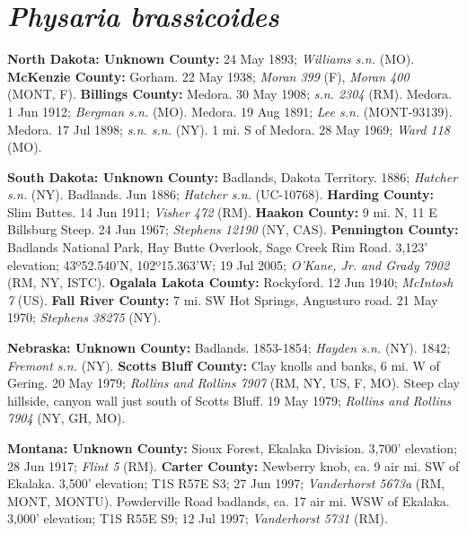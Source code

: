 \section*{\textit{Physaria brassicoides}}

  \textbf{North Dakota: Unknown County:}
24 May 1893; \textit{Williams s.n.} (MO). 
  \textbf{McKenzie County:} 
Gorham. 22 May 1938; \textit{Moran 399} (F), \textit{Moran 400} (MONT, F).  
  \textbf{Billings County:}
Medora. 30 May 1908; \textit{s.n. 2304} (RM).
Medora. 1 Jun 1912; \textit{Bergman s.n.} (MO).
Medora. 19 Aug 1891; \textit{Lee s.n.} (MONT-93139).
Medora. 17 Jul 1898; \textit{s.n. s.n.} (NY).
1 mi. S of Medora. 28 May 1969; \textit{Ward 118} (MO).

  \textbf{South Dakota: Unknown County:}
Badlands, Dakota Territory. 1886; \textit{Hatcher s.n.} (NY).
Badlands. Jun 1886; \textit{Hatcher s.n.} (UC-10768).
  \textbf{Harding County:}
Slim Buttes. 14 Jun 1911; \textit{Visher 472} (RM).
  \textbf{Haakon County:}
9 mi. N, 11 E Billsburg Steep. 24 Jun 1967; \textit{Stephens 12190} (NY, CAS).
  \textbf{Pennington County:}
Badlands National Park, Hay Butte Overlook, Sage Creek Rim Road.
3,123' elevation; 43º52.540'N, 102º15.363'W; 19 Jul 2005;
\textit{O'Kane, Jr. and Grady 7902} (RM, NY, ISTC).
  \textbf{Ogalala Lakota County:}
Rockyford. 12 Jun 1940; \textit{McIntosh 7} (US).
  \textbf{Fall River County:}
7 mi. SW Hot Springs, Angusturo road. 21 May 1970; \textit{Stephens 38275} (NY).

  \textbf{Nebraska: Unknown County:}
Badlands. 1853-1854; \textit{Hayden s.n.} (NY).
1842; \textit{Fremont s.n.} (NY).
  \textbf{Scotts Bluff County:}
Clay knolls and banks, 6 mi. W of Gering. 20 May 1979;
\textit{Rollins and Rollins 7907} (RM, NY, US, F, MO).
Steep clay hillside, canyon wall just south of Scotts Bluff. 19 May 1979;
\textit{Rollins and Rollins 7904} (NY, GH, MO).

  \textbf{Montana: Unknown County:}
Sioux Forest, Ekalaka Division. 3,700' elevation; 28 Jun 1917;
\textit{Flint 5} (RM).
  \textbf{Carter County:}
Newberry knob, ca. 9 air mi. SW of Ekalaka. 3,500' elevation; T1S R57E S3;
27 Jun 1997; \textit{Vanderhorst 5673a} (RM, MONT, MONTU).
Powderville Road badlands, ca. 17 air mi. WSW of Ekalaka. 3,000' elevation;
T1S R55E S9; 12 Jul 1997; \textit{Vanderhorst 5731} (RM).

